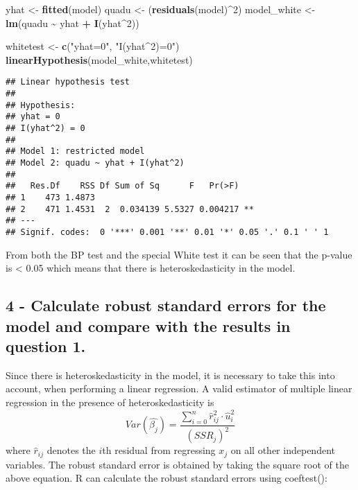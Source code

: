 \documentclass[
]{article}
\newenvironment{Shaded}{\begin{snugshade}}{\end{snugshade}}
\newcommand{\DecValTok}[1]{\textcolor[rgb]{0.00,0.00,0.81}{#1}}
\newcommand{\FunctionTok}[1]{\textcolor[rgb]{0.13,0.29,0.53}{\textbf{#1}}}
\newcommand{\NormalTok}[1]{#1}
\newcommand{\OtherTok}[1]{\textcolor[rgb]{0.56,0.35,0.01}{#1}}
\newcommand{\SpecialCharTok}[1]{\textcolor[rgb]{0.81,0.36,0.00}{\textbf{#1}}}
\newcommand{\StringTok}[1]{\textcolor[rgb]{0.31,0.60,0.02}{#1}}
\begin{document}
\begin{Shaded}
\begin{Highlighting}[]
\NormalTok{yhat }\OtherTok{\textless{}{-}} \FunctionTok{fitted}\NormalTok{(model)}
\NormalTok{quadu }\OtherTok{\textless{}{-}}\NormalTok{ (}\FunctionTok{residuals}\NormalTok{(model)}\SpecialCharTok{\^{}}\DecValTok{2}\NormalTok{)}
\NormalTok{model\_white }\OtherTok{\textless{}{-}} \FunctionTok{lm}\NormalTok{(quadu }\SpecialCharTok{\textasciitilde{}}\NormalTok{ yhat }\SpecialCharTok{+} \FunctionTok{I}\NormalTok{(yhat}\SpecialCharTok{\^{}}\DecValTok{2}\NormalTok{))}

\NormalTok{whitetest }\OtherTok{\textless{}{-}} \FunctionTok{c}\NormalTok{(}\StringTok{"yhat=0"}\NormalTok{, }\StringTok{"I(yhat\^{}2)=0"}\NormalTok{)}
\FunctionTok{linearHypothesis}\NormalTok{(model\_white,whitetest)}
\end{Highlighting}
\end{Shaded}

\begin{verbatim}
## Linear hypothesis test
## 
## Hypothesis:
## yhat = 0
## I(yhat^2) = 0
## 
## Model 1: restricted model
## Model 2: quadu ~ yhat + I(yhat^2)
## 
##   Res.Df    RSS Df Sum of Sq      F   Pr(>F)   
## 1    473 1.4873                                
## 2    471 1.4531  2  0.034139 5.5327 0.004217 **
## ---
## Signif. codes:  0 '***' 0.001 '**' 0.01 '*' 0.05 '.' 0.1 ' ' 1
\end{verbatim}

From both the BP test and the special White test it can be seen that the
p-value is \textless{} 0.05 which means that there is heteroskedasticity
in the model.

\subsection{4 - Calculate robust standard errors for the model and
compare with the results in question
1.}\label{calculate-robust-standard-errors-for-the-model-and-compare-with-the-results-in-question-1.}

Since there is heteroskedasticity in the model, it is necessary to take
this into account, when performing a linear regression. A valid
estimator of multiple linear regression in the presence of
heteroskedasticity is
\[Var(\hat{\beta_j})=\frac{\sum\limits_{i=0}^n\hat{r}^2_{ij}\cdot\hat{u}^2_i}{(SSR_j)^2}\]
where \(\hat{r}_{ij}\) denotes the \(i\)th residual from regressing
\(x_j\) on all other independent variables. The robust standard error is
obtained by taking the square root of the above equation. R can
calculate the robust standard errors using coeftest():
\end{document}
